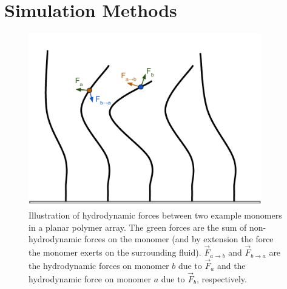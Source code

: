 \documentclass[11pt]{ucthesis}
\begin{document}
\section{Simulation Methods}
\label{app:sim}

\begin{figure}
\begin{center}
\includegraphics[width = 4in]{hydroforces}
\caption{Illustration of hydrodynamic forces between two example
monomers in a planar polymer array. The green forces are the sum
of non-hydrodynamic forces on the monomer (and by extension the
force the monomer exerts on the surrounding fluid). $\vec F_{a\rightarrow
b}$ and $\vec F_{b\rightarrow a}$ are the hydrodynamic forces on
monomer $b$ due to $\vec F_a$ and the hydrodynamic force on monomer
$a$ due to $\vec F_b$, respectively. 
\label{fig:hydroforces}}
\end{center}
\end{figure}
\end{document}
